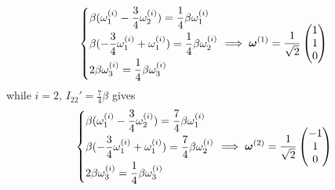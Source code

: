 \documentclass{article}
\begin{document}
        \begin{equation*}
            \begin{dcases*}
                \beta (\omega^{(i)}_1 - \frac{3}{4} \omega^{(i)}_2) = \frac{1}{4}\beta\omega^{(i)}_1 \\
                \beta (- \frac{3}{4} \omega^{(i)}_1 + \omega^{(i)}_1) = \frac{1}{4}\beta \omega^{(i)}_2 \\
                2 \beta \omega^{(i)}_3 = \frac{1}{4}\beta \omega^{(i)}_3
            \end{dcases*}
            \implies
            \boldsymbol{\omega}^{(1)} = \frac{1}{\sqrt{2}}
                \begin{pmatrix}
                    1 \\
                    1 \\
                    0 \\
                \end{pmatrix}
        \end{equation*}
        while $i = 2, \, I_{22}' = \frac{7}{4}\beta$ gives
        \begin{equation*}
            \begin{dcases*}
                \beta (\omega^{(i)}_1 - \frac{3}{4} \omega^{(i)}_2) = \frac{7}{4}\beta\omega^{(i)}_1 \\
                \beta (- \frac{3}{4} \omega^{(i)}_1 + \omega^{(i)}_1) = \frac{7}{4}\beta \omega^{(i)}_2 \\
                2 \beta \omega^{(i)}_3 = \frac{1}{4}\beta \omega^{(i)}_3
            \end{dcases*}
            \implies 
            \boldsymbol{\omega}^{(2)} = \frac{1}{\sqrt{2}}
                \begin{pmatrix}
                    -1 \\
                    1 \\
                    0 \\
                \end{pmatrix}
        \end{equation*}
    
\end{document}
